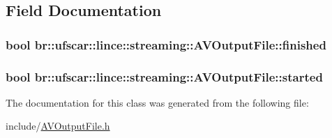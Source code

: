 \subsection{Field Documentation}
\hypertarget{classbr_1_1ufscar_1_1lince_1_1streaming_1_1AVOutputFile_a05bd40f9a819e79d6e7e0c79dbe270cd}{
\subsubsection[{finished}]{\setlength{\rightskip}{0pt plus 5cm}bool {\bf br::ufscar::lince::streaming::AVOutputFile::finished}}}
\label{classbr_1_1ufscar_1_1lince_1_1streaming_1_1AVOutputFile_a05bd40f9a819e79d6e7e0c79dbe270cd}
\hypertarget{classbr_1_1ufscar_1_1lince_1_1streaming_1_1AVOutputFile_ab618c1df2d6a894b7959f7f9a5d3dbb0}{
\subsubsection[{started}]{\setlength{\rightskip}{0pt plus 5cm}bool {\bf br::ufscar::lince::streaming::AVOutputFile::started}}}
\label{classbr_1_1ufscar_1_1lince_1_1streaming_1_1AVOutputFile_ab618c1df2d6a894b7959f7f9a5d3dbb0}


The documentation for this class was generated from the following file:\begin{DoxyCompactItemize}
\item 
include/\hyperlink{AVOutputFile_8h}{AVOutputFile.h}\end{DoxyCompactItemize}
